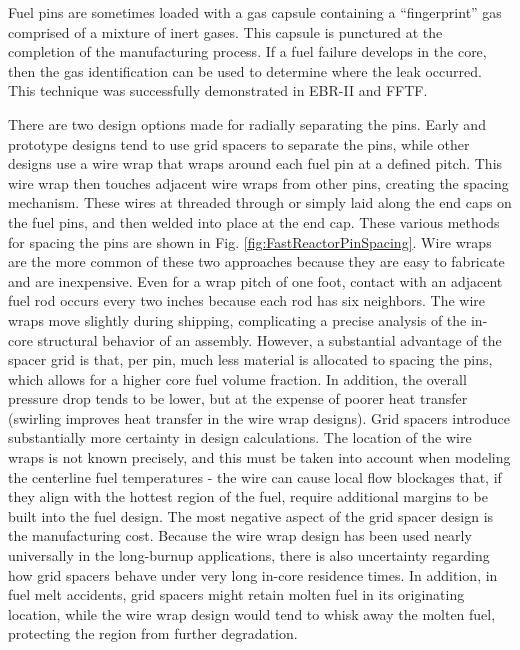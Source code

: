 \documentclass[10pt]{article}
\numberwithin{equation}{section} %
\begin{document}
Fuel pins are sometimes loaded with a gas capsule containing a ``fingerprint'' gas comprised of a mixture of inert gases. This capsule is punctured at the completion of the manufacturing process. If a fuel failure develops in the core, then the gas identification can be used to determine where the leak occurred. This technique was successfully demonstrated in EBR-II and FFTF. 

There are two design options made for radially separating the pins. Early and prototype designs tend to use grid spacers to separate the pins, while other designs use a wire wrap that wraps around each fuel pin at a defined pitch. This wire wrap then touches adjacent wire wraps from other pins, creating the spacing mechanism. These wires at threaded through or simply laid along the end caps on the fuel pins, and then welded into place at the end cap. These various methods for spacing the pins are shown in Fig. \ref{fig:FastReactorPinSpacing}. Wire wraps are the more common of these two approaches because they are easy to fabricate and are inexpensive. Even for a wrap pitch of one foot, contact with an adjacent fuel rod occurs every two inches because each rod has six neighbors. The wire wraps move slightly during shipping, complicating a precise analysis of the in-core structural behavior of an assembly. However, a substantial advantage of the spacer grid is that, per pin, much less material is allocated to spacing the pins, which allows for a higher core fuel volume fraction. In addition, the overall pressure drop tends to be lower, but at the expense of poorer heat transfer (swirling improves heat transfer in the wire wrap designs). Grid spacers introduce substantially more certainty in design calculations. The location of the wire wraps is not known precisely, and this must be taken into account when modeling the centerline fuel temperatures - the wire can cause local flow blockages that, if they align with the hottest region of the fuel, require additional margins to be built into the fuel design. The most negative aspect of the grid spacer design is the manufacturing cost. Because the wire wrap design has been used nearly universally in the long-burnup applications, there is also uncertainty regarding how grid spacers behave under very long in-core residence times. In addition, in fuel melt accidents, grid spacers might retain molten fuel in its originating location, while the wire wrap design would tend to whisk away the molten fuel, protecting the region from further degradation. 
\end{document}
